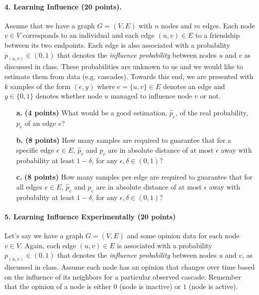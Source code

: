 \documentclass[11pt]{article}
\theoremstyle{definition} \newtheorem{Theorem}{theorem}
\begin{document}
\paragraph{4. Learning Influence (20 points).} Assume that we have a graph $G = (V,E)$ with $n$ nodes and $m$ edges. Each node $v \in V$ corresponds to an individual and each edge $(u,v) \in E$ to a friendship between its two endpoints. Each edge is also associated with a probability $p_{(u,v)} \in (0,1)$ that denotes the \emph{influence probability} between nodes $u$ and $v$ as discussed in class. These probabilities are unknown to us and we would like to estimate them from data (e.g. cascades). Towards this end, we are presented with $k$ samples of the form $(e, y)$ where $e = \{u,v\} \in E$ denotes an edge and $y \in \{0,1\}$ denotes whether node $u$ managed to influence node $v$ or not.
\begin{itemize}
\item[\textbf{a. }] \textbf{(4 points)} What would be a good estimation, $\hat{p}_e$, of the real probability, $p_e$ of an edge $e$?
\item[\textbf{b. }] \textbf{(8 points)} How many samples are required to guarantee that for a specific edge $e \in E$, $\hat{p}_e$ and $p_e$ are in absolute distance of at most $\epsilon$ away with probability at least $1- \delta$, for any $\epsilon, \delta \in (0,1)$?
\item[\textbf{c. }] \textbf{(8 points)} How many samples per edge are required to guarantee that for all edges $e \in E$, $\hat{p}_e$ and $p_e$ are in absolute distance of at most $\epsilon$ away with probability at least $1- \delta$, for any $\epsilon, \delta \in (0,1)$?

\end{itemize}

\paragraph{5. Learning Influence Experimentally (20 points)}
\par Let's say we have a graph $G = (V,E)$ and some opinion data for each node $v \in V$. Again, each edge $(u,v) \in E$ is associated with a probability $p_{(u,v)} \in (0,1)$ that denotes the \emph{influence probability} between nodes $u$ and $v$, as discussed in class. Assume each node has an opinion that changes over time based on the influence of its neighbors for a particular observed cascade. Remember that the opinion of a node is either $0$ (node is inactive) or $1$ (node is active).
\end{document}
